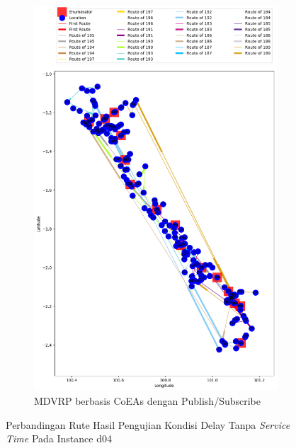 \begin{figure}[H]\ContinuedFloat
	\centering
	\begin{subfigure}[t]{\textwidth}
		\centering
		\includegraphics[width=\textwidth]{Resources/Images/delayed_4/real_m15_n100_delayed_4_pubsub_coes}
		\caption{MDVRP berbasis CoEAs dengan Publish/Subscribe}
		\label{fig:real_m15_n100_delayed_4_pubsub_coes}
	\end{subfigure}
	\caption{Perbandingan Rute Hasil Pengujian Kondisi Delay Tanpa \textit{Service Time} Pada Instance d04}
	\label{fig:real_m15_n100_delayed_4_contd}
\end{figure}


